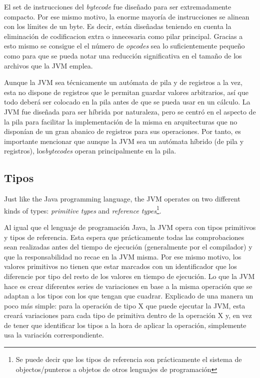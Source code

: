 \documentclass[english,runningheads,a4paper]{llncs}[2018/03/10]
\begin{document}
El set de instrucciones del \textit{bytecode} fue diseñado para ser
extremadamente compacto. Por ese mismo motivo, la enorme mayoría de
instrucciones se alinean con los límites de un byte. Es decir, están diseñadas
teniendo en cuenta la eliminación de codificacion extra o innecesaria como pilar
principal. Gracias a esto mismo se consigue el el número de \textit{opcodes} sea
lo suficientemente pequeño como para que se pueda notar una reducción
significativa en el tamaño de los archivos que la JVM emplea.

Aunque la JVM sea técnicamente un autómata de pila y de registros a la vez, esta
no dispone de registros que le permitan guardar valores arbitrarios, así que
todo deberá ser colocado en la pila antes de que se pueda usar en un cálculo. La
JVM fue diseñada para ser híbrida por naturaleza, pero se centró en el aspecto
de la pila para facilitar la implementación de la misma en arquitecturas que no
disponían de un gran abanico de registros para sus operaciones. Por tanto, es
importante mencionar que aunque la JVM sea un autómata híbrido (de pila y
registros), los\textit{bytecodes} operan principalmente en la pila.

\subsection*{Tipos}
Just like the Java programming language, the JVM operates on two different kinds
of types: \textit{primitive types} and \textit{reference types}\footnote{Se
puede decir que los tipos de referencia son prácticamente el sistema de
objectos/punteros a objetos de otros lenguajes de programación}.

Al igual que el lenguaje de programación Java, la JVM opera con tipos primitivos
y tipos de referencia. Esta espera que prácticamente todas las comprobaciones
sean realizadas antes del tiempo de ejecución (generalmente por el compilador) y
que la responsabilidad no recae en la JVM misma. Por ese mismo motivo, los
valores primitivos no tienen que estar marcados con un identificador que los
diferencie por tipo del resto de los valores en tiempo de ejecución. Lo que la
JVM hace es crear diferentes series de variaciones en base a la misma operación
que se adaptan a los tipos con los que tengan que cuadrar. Explicado de una
manera un poco más simple: para la operación de tipo X que puede ejecutar la
JVM, esta creará variaciones para cada tipo de primitiva dentro de la operación
X y, en vez de tener que identificar los tipos a la hora de aplicar la
operación, simplemente usa la variación correspondiente.
\end{document}

